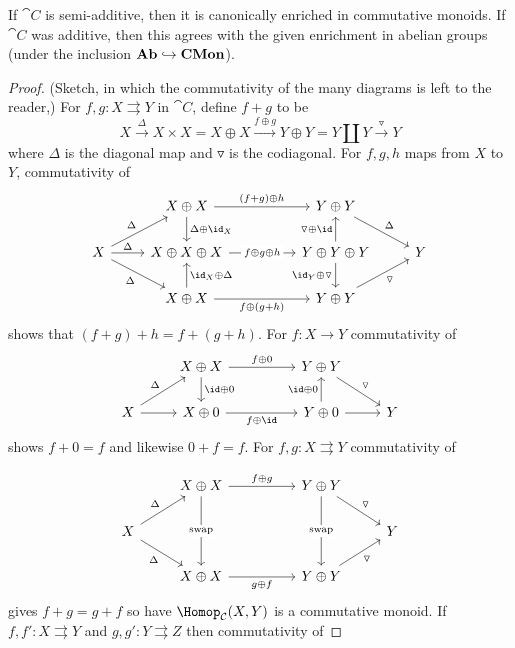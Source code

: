\documentclass[../main.tex]{subfiles}
\begin{document}
\begin{lem}
	If $\cat C$ is semi-additive, then it is canonically enriched in commutative monoids. If $\cat C$ was additive, then this agrees with the given enrichment in abelian groups (under the inclusion $\mathbf{Ab} \hookrightarrow \mathbf{CMon}$).
\end{lem}
\begin{proof}(Sketch, in which the commutativity of the many diagrams is left to the reader,)
	For $f, g: X \rightrightarrows Y$ in $\cat C$, define $f + g$ to be
	\[
		X \xrightarrow{\Delta} X \times X = X \oplus X \xrightarrow{f \oplus g} Y \oplus Y = Y \coprod Y \xrightarrow{\triangledown} Y
	\] where $\Delta$ is the diagonal map and $\triangledown$ is the codiagonal.
	For $f, g, h$ maps from $X$ to $Y$, commutativity of 
\[\begin{tikzcd}
	& {X\oplus X} && {Y\oplus Y} \\
	X & {X\oplus X\oplus X} && {Y\oplus Y\oplus Y} & Y \\
	& {X\oplus X} && {Y\oplus Y}
	\arrow["\Delta", from=2-1, to=1-2]
	\arrow["{\id_X \oplus \Delta}"', from=3-2, to=2-2]
	\arrow["{\Delta \oplus \id_X}", from=1-2, to=2-2]
	\arrow["\Delta", from=2-1, to=2-2]
	\arrow["\Delta"', from=2-1, to=3-2]
	\arrow["{f \oplus(g+h)}"', from=3-2, to=3-4]
	\arrow["{(f+g)\oplus h}", from=1-2, to=1-4]
	\arrow["{\triangledown \oplus \id}", from=2-4, to=1-4]
	\arrow["{\id_Y \oplus \triangledown}"', from=2-4, to=3-4]
	\arrow["\triangledown"', from=3-4, to=2-5]
	\arrow["\Delta", from=1-4, to=2-5]
	\arrow["{f\oplus g\oplus h}"{description}, from=2-2, to=2-4]
\end{tikzcd}\]	
	shows that $(f+g) + h = f + (g + h)$. For $f: X \to Y$ commutativity of 
\[\begin{tikzcd}
	& {X\oplus X} && {Y\oplus Y} \\
	X & {X \oplus 0} && {Y\oplus 0} & Y
	\arrow[from=2-1, to=2-2]
	\arrow["\id\oplus0", from=1-2, to=2-2]
	\arrow["\Delta", from=2-1, to=1-2]
	\arrow["{f\oplus \id}"', from=2-2, to=2-4]
	\arrow["{f\oplus 0}", from=1-2, to=1-4]
	\arrow["\triangledown", from=1-4, to=2-5]
	\arrow[from=2-4, to=2-5]
	\arrow["{\id \oplus 0}", from=2-4, to=1-4]
\end{tikzcd}\]	
	 shows $f + 0 = f$ and likewise $ 0 + f = f$.
	 For $f,g: X \rightrightarrows Y$ commutativity of 
	
\[\begin{tikzcd}
	& {X\oplus X} && {Y\oplus Y} \\
	X &&&& Y \\
	& {X\oplus X} && {Y\oplus Y}
	\arrow["\triangledown", from=1-4, to=2-5]
	\arrow["\triangledown"', from=3-4, to=2-5]
	\arrow["{g \oplus f}"', from=3-2, to=3-4]
	\arrow["{f\oplus g}", from=1-2, to=1-4]
	\arrow["\Delta", from=2-1, to=1-2]
	\arrow["\Delta"', from=2-1, to=3-2]
	\arrow["{\text{swap}}"{description}, from=1-2, to=3-2]
	\arrow["{\text{swap}}"{description}, from=1-4, to=3-4]
\end{tikzcd}\]	 gives $f + g = g + f$ so have $\Hom_{\cat C}(X,Y)$ is a commutative monoid. If $f,f': X \rightrightarrows Y$ and $g,g':Y  \rightrightarrows Z$ then commutativity of 


\end{proof}
\end{document}
